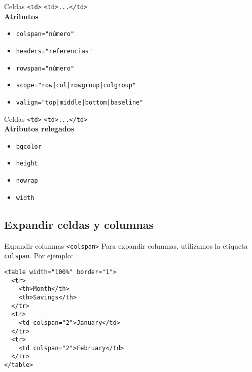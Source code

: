 \documentclass{beamer}
\begin{document}
\begin{frame}{Celdas \texttt{<td>}} %
    \texttt{<td>...</td>}\\
    \textbf{Atributos}
    {\footnotesize 
    \begin{itemize}
            \item \texttt{colspan="número"}
            \item \texttt{headers="referencias"}
            \item \texttt{rowspan="número"}
            \item \texttt{scope="row|col|rowgroup|colgroup"}
            \item \texttt{valign="top|middle|bottom|baseline"}
    \end{itemize}
    }
\end{frame}

\begin{frame}{Celdas \texttt{<td>}} %
        \texttt{<td>...</td>}\\
        \textbf{Atributos relegados}
        \begin{itemize}
            \item \texttt{bgcolor}
            \item \texttt{height}
            \item \texttt{nowrap}
            \item \texttt{width}
        \end{itemize}
\end{frame}

\subsection{Expandir celdas y columnas} %
\label{sub:Expandir celdas y columnas}

\begin{frame}[fragile]{Expandir columnas \texttt{<colspan>} } %
        Para expandir columnas, utilizamos la etiqueta \texttt{colspan}. Por
        ejemplo: 

        \begin{lstlisting}
<table width="100%" border="1">
  <tr>
    <th>Month</th>
    <th>Savings</th>
  </tr>
  <tr>
    <td colspan="2">January</td>
  </tr>
  <tr>
    <td colspan="2">February</td>
  </tr>
</table>            
        \end{lstlisting}
\end{frame}
\end{document}
